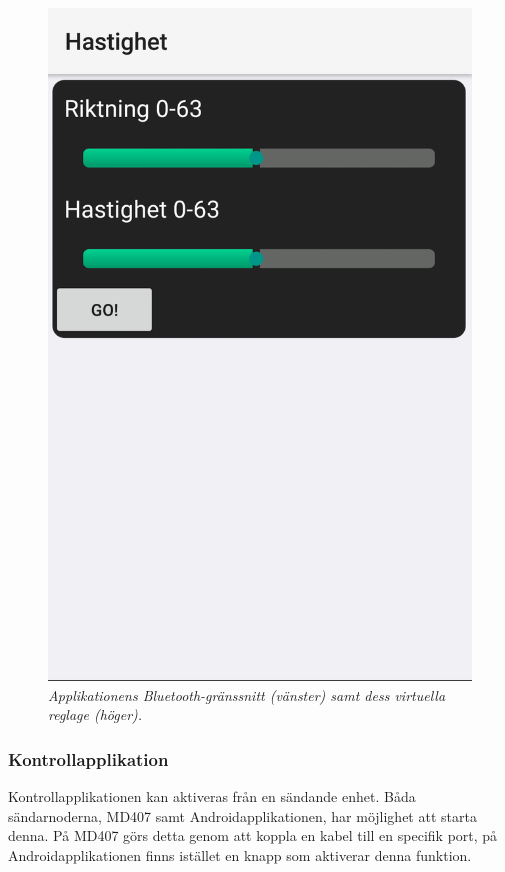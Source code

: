\documentclass[a4paper]{article}
\begin{document}
\begin{figure}[H]
\includegraphics[scale=0.2]{Mobilapp2.png}
\centering
\caption{\it Applikationens Bluetooth-gränssnitt (vänster) samt dess virtuella reglage (höger).}
\end{figure}

\subsubsection{Kontrollapplikation}
Kontrollapplikationen kan aktiveras från en sändande enhet. Båda sändarnoderna, MD407 samt Androidapplikationen, har möjlighet att starta denna. På MD407 görs detta genom att koppla en kabel till en specifik port, på Androidapplikationen finns istället en knapp som aktiverar denna funktion.
\end{document}
